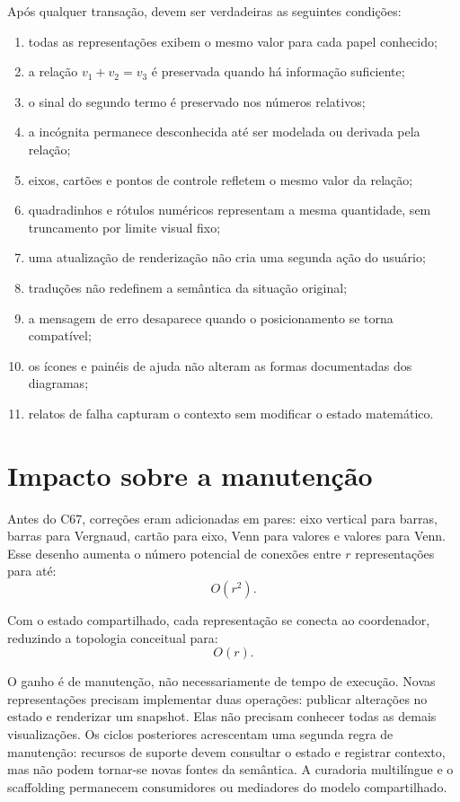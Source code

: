 \documentclass[12pt,a4paper]{article}
\begin{document}
Após qualquer transação, devem ser verdadeiras as seguintes condições:
\begin{enumerate}[noitemsep]
  \item todas as representações exibem o mesmo valor para cada papel conhecido;
  \item a relação $v_1+v_2=v_3$ é preservada quando há informação suficiente;
  \item o sinal do segundo termo é preservado nos números relativos;
  \item a incógnita permanece desconhecida até ser modelada ou derivada pela relação;
  \item eixos, cartões e pontos de controle refletem o mesmo valor da relação;
  \item quadradinhos e rótulos numéricos representam a mesma quantidade, sem truncamento por limite visual fixo;
  \item uma atualização de renderização não cria uma segunda ação do usuário;
  \item traduções não redefinem a semântica da situação original;
  \item a mensagem de erro desaparece quando o posicionamento se torna compatível;
  \item os ícones e painéis de ajuda não alteram as formas documentadas dos diagramas;
  \item relatos de falha capturam o contexto sem modificar o estado matemático.
\end{enumerate}

\section{Impacto sobre a manutenção}

Antes do C67, correções eram adicionadas em pares: eixo vertical para barras, barras para Vergnaud, cartão para eixo, Venn para valores e valores para Venn. Esse desenho aumenta o número potencial de conexões entre $r$ representações para até:
\[
O(r^2).
\]

Com o estado compartilhado, cada representação se conecta ao coordenador, reduzindo a topologia conceitual para:
\[
O(r).
\]

O ganho é de manutenção, não necessariamente de tempo de execução. Novas representações precisam implementar duas operações: publicar alterações no estado e renderizar um snapshot. Elas não precisam conhecer todas as demais visualizações. Os ciclos posteriores acrescentam uma segunda regra de manutenção: recursos de suporte devem consultar o estado e registrar contexto, mas não podem tornar-se novas fontes da semântica. A curadoria multilíngue e o scaffolding permanecem consumidores ou mediadores do modelo compartilhado.
\end{document}
